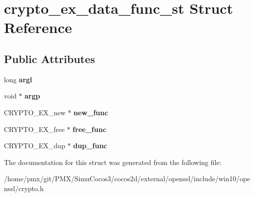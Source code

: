 \hypertarget{structcrypto__ex__data__func__st}{}\section{crypto\+\_\+ex\+\_\+data\+\_\+func\+\_\+st Struct Reference}
\label{structcrypto__ex__data__func__st}
\subsection*{Public Attributes}
\begin{DoxyCompactItemize}
\item 
\mbox{\label{structcrypto__ex__data__func__st_a3290d05d491702cb0c8c19e9e8fee261}} 
long {\bfseries argl}
\item 
\mbox{\label{structcrypto__ex__data__func__st_a06d5de8bf9d50af5c74088e9ea10c60d}} 
void $\ast$ {\bfseries argp}
\item 
\mbox{\label{structcrypto__ex__data__func__st_a83923e40c83463bdf292ed628af6db05}} 
C\+R\+Y\+P\+T\+O\+\_\+\+E\+X\+\_\+new $\ast$ {\bfseries new\+\_\+func}
\item 
\mbox{\label{structcrypto__ex__data__func__st_acce7bd60712d1319e666f1bd9fbdeabf}} 
C\+R\+Y\+P\+T\+O\+\_\+\+E\+X\+\_\+free $\ast$ {\bfseries free\+\_\+func}
\item 
\mbox{\label{structcrypto__ex__data__func__st_a3ba1b7f5fec2a001822f70e5862d72b5}} 
C\+R\+Y\+P\+T\+O\+\_\+\+E\+X\+\_\+dup $\ast$ {\bfseries dup\+\_\+func}
\end{DoxyCompactItemize}


The documentation for this struct was generated from the following file\+:\begin{DoxyCompactItemize}
\item 
/home/pmx/git/\+P\+M\+X/\+Simu\+Cocos3/cocos2d/external/openssl/include/win10/openssl/crypto.\+h\end{DoxyCompactItemize}
